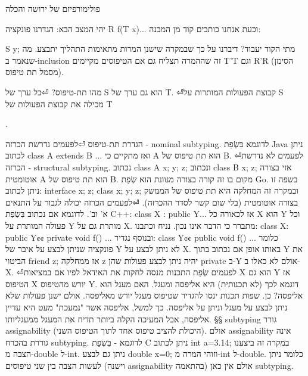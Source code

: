 \begin{טבלא}[!htbp]
        פולימורפיזם של ירושה והכלה

יהי המצב הבא: הגדרנו פונקציה R f(T x){...} וכעת אנחנו כותבים קוד מן המבנה:

        S y;
מתי הקוד יעבוד? דיברנו על כך שבמקרה שישנן המרות מתאימות התהליך יתבצע. מה שנאמר ב-inclusion זה שההמרה תצליח גם אם הטיפוסים מקיימים T'T וגם R'R (הסימן מסמל תת טיפוס).

מהו תת-טיפוס?
⏎כל ערך של S הוא גם ערך של T.
⏎קבוצת הפעולות המותרות על S מכילה את קבוצת הפעולות של T

        .

        הגדרת תת-טיפוס
⏎לפעמים נדרשת הכרזה - nominal subtyping.
        לדוגמא בִּשְׂפַת Java ניתן לכתוב class A extends B {...} ואז מתקיים כי A הוא תת טיפוס של B.
⏎לפעמים לא נדרשת הכרזה - structural subtyping.
        נכתוב class A { x; y; z; } ונכתוב class B {x; z;} אזי בצורה אוטומטית A הוא תת טיפוס של B.
        מקום בו זה קורה בצורה מנוונת הוא שְׂפַת Go. בשפה זו ניתן לכתוב:
        interface { x; z; }
        class {x; y; z; }
        ובמקרה זה המחלקה היא תת טיפוס של הממשק בצורה אוטומטית (בלי שום קשר לסדר ההכרזה).
⏎לפעמים הכרזה יכולה לגבור על התנאים א' וב'.
        לדוגמא אם נכתוב בִּשְׂפַת C++:
        class X : public Y{...} אז לכאורה כל X הוא Y וכל פעולה המותרת על Y מותרת גם על X. מתברר כי הדבר אינו נכון.
        נניח וכתבנו:
        class X: public Y{¢¢
          private void f() {...}
        }
        ובנוסף נגדיר:
        class Y{¢¢
          public void f() {...}
        }
        כלומר פונקציה שניתן לבצע על איבר של Y לא ניתן לבצע על X.
        באותו אופן אם נכתוב בתוך Y את הביטוי friend z; אז ממחלקה z יהיה ניתן לבצע פעולות שהן private ב-Y אולם לא כאלו ב-X.
⏎לפעמים שְׂפַת התכנות מנסה לחקות את האידאל לפיו אם במציאות X הוא גם Y אז הטיפוס X יורש מהטיפוס Y.
        דוגמא לכך (לא תכנותית) היא אליפסה ומעגל.
        האם מעגל הוא אליפסה? כן.
        שפות תכנות ינסו להגדיר שטיפוס מעגל יורש מאליפסה. אולם ישנן פעולות שלא ניתן לבצע על מעגל וניתן על אליפסה. כך למשל, אליפסה אשר "נמעכת" מעט היא עדיין אליפסה, אבל המעיכה הקלה ביותר תדיח את המעגל ממעגליותו.
        §§ subtyping גורר assignability (היכולת להציב טיפוס אחד לתוך הטיפוס השני). אולם assignability אינה גוררת בהכרח subtyping.
        לדוגמא - בִּשְׂפַת C ניתן לכתוב int a=3.14; במקרה זה ביצענו הצבה מ-double ל-int.
        ניתן גם לבצע double x=0; וזוהי המרה מ-int ל-double. כלומר ניתן לעשות הצבה בין שני טיפוסים (וישנה assignability בהתאמה) אולם אין כאן subtyping.


\end{טבלא}
